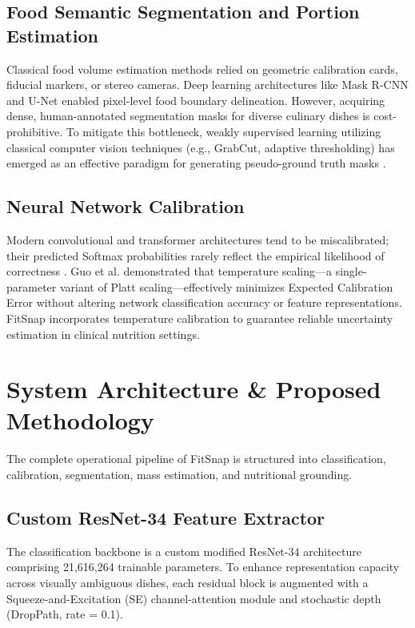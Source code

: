 \documentclass[conference]{IEEEtran}
\begin{document}
\subsection{Food Semantic Segmentation and Portion Estimation}
Classical food volume estimation methods relied on geometric calibration cards, fiducial markers, or stereo cameras. Deep learning architectures like Mask R-CNN and U-Net \cite{ronneberger2015} enabled pixel-level food boundary delineation. However, acquiring dense, human-annotated segmentation masks for diverse culinary dishes is cost-prohibitive. To mitigate this bottleneck, weakly supervised learning utilizing classical computer vision techniques (e.g., GrabCut, adaptive thresholding) has emerged as an effective paradigm for generating pseudo-ground truth masks \cite{rother2004}.

\subsection{Neural Network Calibration}
Modern convolutional and transformer architectures tend to be miscalibrated; their predicted Softmax probabilities rarely reflect the empirical likelihood of correctness \cite{guo2017}. Guo et al. \cite{guo2017} demonstrated that temperature scaling—a single-parameter variant of Platt scaling—effectively minimizes Expected Calibration Error without altering network classification accuracy or feature representations. FitSnap incorporates temperature calibration to guarantee reliable uncertainty estimation in clinical nutrition settings.

\section{System Architecture \& Proposed Methodology}
The complete operational pipeline of FitSnap is structured into classification, calibration, segmentation, mass estimation, and nutritional grounding.

\subsection{Custom ResNet-34 Feature Extractor}
The classification backbone is a custom modified ResNet-34 architecture comprising 21,616,264 trainable parameters. To enhance representation capacity across visually ambiguous dishes, each residual block is augmented with a Squeeze-and-Excitation (SE) channel-attention module \cite{hu2018} and stochastic depth (DropPath, rate = 0.1). 
\end{document}
